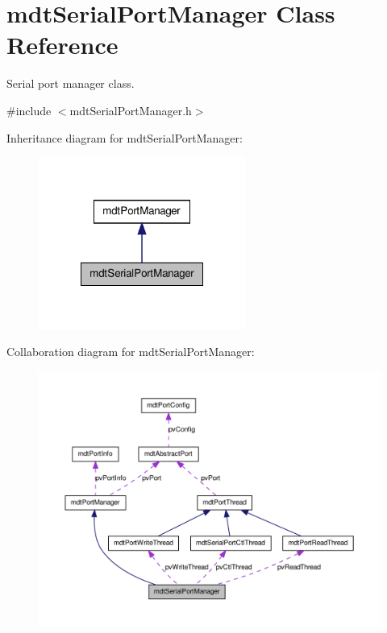 \hypertarget{classmdt_serial_port_manager}{
\section{mdtSerialPortManager Class Reference}
\label{classmdt_serial_port_manager}
}


Serial port manager class.  




{\ttfamily \#include $<$mdtSerialPortManager.h$>$}



Inheritance diagram for mdtSerialPortManager:\nopagebreak
\begin{figure}[H]
\begin{center}
\leavevmode
\includegraphics[width=192pt]{classmdt_serial_port_manager__inherit__graph}
\end{center}
\end{figure}


Collaboration diagram for mdtSerialPortManager:\nopagebreak
\begin{figure}[H]
\begin{center}
\leavevmode
\includegraphics[width=400pt]{classmdt_serial_port_manager__coll__graph}
\end{center}
\end{figure}

